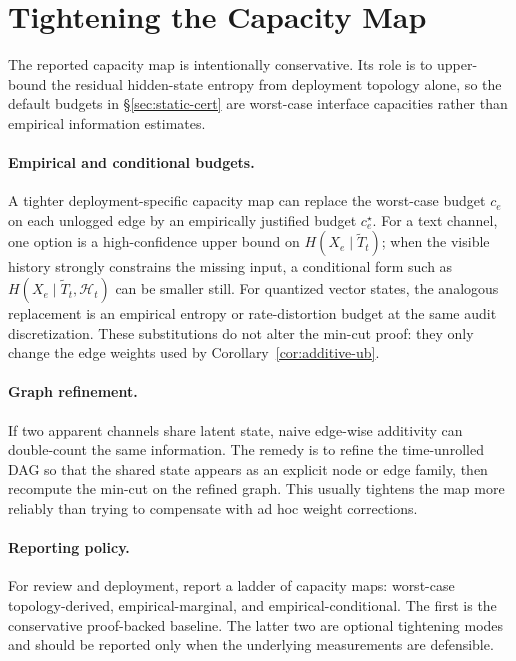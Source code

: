   \section{Tightening the Capacity Map}
  \label{app:static-tightening}

  The reported capacity map is intentionally conservative. Its role is to
  upper-bound the residual hidden-state entropy from deployment topology alone,
  so the default budgets in \S\ref{sec:static-cert} are worst-case interface
  capacities rather than empirical information estimates.

  \paragraph{Empirical and conditional budgets.}
  A tighter deployment-specific capacity map can replace the worst-case budget
  $c_e$ on each unlogged edge by an empirically justified budget $c_e^\star$.
  For a text channel, one option is a high-confidence upper bound on $H(X_e \mid
   \tilde T_t)$; when the visible history strongly constrains the missing input,
   a conditional form such as $H(X_e \mid \tilde T_t, \mathcal H_t)$ can be
  smaller still. For quantized vector states, the analogous replacement is an
  empirical entropy or rate-distortion budget at the same audit discretization.
  These substitutions do not alter the min-cut proof: they only change the edge
  weights used by Corollary~\ref{cor:additive-ub}.

  \paragraph{Graph refinement.}
  If two apparent channels share latent state, naive edge-wise additivity can
  double-count the same information. The remedy is to refine the time-unrolled
  DAG so that the shared state appears as an explicit node or edge family, then
  recompute the min-cut on the refined graph. This usually tightens the map more
  reliably than trying to compensate with ad hoc weight corrections.

  \paragraph{Reporting policy.}
  For review and deployment, report a ladder of capacity maps: worst-case
  topology-derived, empirical-marginal, and empirical-conditional. The first is
  the conservative proof-backed baseline. The latter two are optional
  tightening modes and should be reported only when the underlying measurements
  are defensible.
